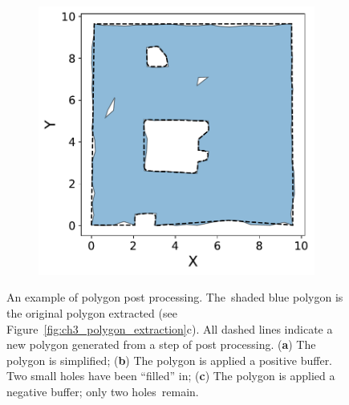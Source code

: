 \begin{figure}[!ht]
\begin{subfigure}[t]{.30\linewidth}
    \caption{\label{fig:ch3_polygon_post_b}}
  \end{subfigure}
  \hfill
  \begin{subfigure}[t]{.30\linewidth}
    \centering\includegraphics[clip,trim=0cm 0cm 0cm 0cm,width=.99\linewidth]{chapter_3_polylidar3d/imgs/polygon/PolygonExtraction_e.pdf}
    \caption{\label{fig:ch3_polygon_post_c}}
  \end{subfigure}
  \caption[Example of polygon post processing]{An example of polygon post processing. The~shaded blue polygon is the original polygon extracted (see Figure~\ref{fig:ch3_polygon_extraction}c). All dashed lines indicate a new polygon generated from a step of post processing. (\textbf{a}) The polygon is simplified; (\textbf{b}) The polygon is applied a positive buffer. Two small holes have been ``filled'' in; (\textbf{c}) The polygon is applied a negative buffer; only two holes~remain. }\label{fig:ch3_polygon_post}
\end{figure}
\unskip





